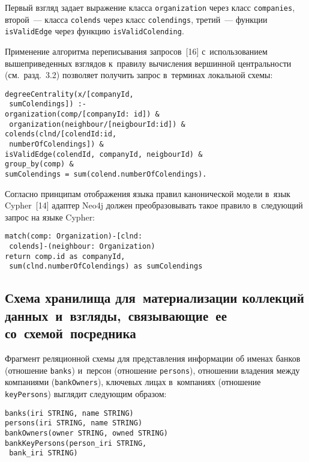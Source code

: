 \begin{multicols}{2}
      Первый взгляд задает выражение класса \verb"organization" через класс 
\verb"companies", второй~--- класса \verb"colends" через класс \verb"colendings", 
третий~--- функции \verb"isValidEdge" через функцию \verb"isValidColending".
      
      Применение алгоритма переписывания запросов~[16] с~использованием 
вышеприведенных взглядов к~правилу вычисления вершинной централь\-ности 
(см.\ разд.~3.2) позволяет получить запрос в~терминах локальной схемы:

\vspace*{-2pt}

      \noindent
      {\small\begin{verbatim}
degreeCentrality(x/[companyId, 
 sumColendings]) :-
organization(comp/[companyId: id]) & 
 organization(neighbour/[neigbourId:id]) &
colends(clnd/[colendId:id, 
 numberOfColendings]) &
isValidEdge(colendId, companyId, neigbourId) &
group_by(comp) &
sumColendings = sum(colend.numberOfColendings).
\end{verbatim}
}

\vspace*{-2pt}

      Согласно принципам отображения языка правил канонической модели 
в~язык Cypher~[14] адап\-тер Neo4j должен преобразовывать такое правило 
в~следующий запрос на языке Cypher:

\vspace*{-2pt}

  \noindent
     {\small \begin{verbatim}
match(comp: Organization)-[clnd:
 colends]-(neighbour: Organization)
return comp.id as companyId, 
 sum(clnd.numberOfColendings) as sumColendings
\end{verbatim}
}

\vspace*{-4pt}

\subsection{Схема хранилища для~материализации коллекций 
данных~и~взгляды,~связывающие~ее со~схемой~посредника}

\vspace*{-2pt}
      
      Фрагмент реляционной схемы для представления информации об 
именах банков (отношение \verb"banks") и~персон (отношение \verb"persons"), 
отношении владения между компаниями (\verb"bankOwners"), ключевых лицах 
в~компаниях (отношение \verb"keyPersons") выглядит следующим образом:
{\small      \begin{verbatim}
banks(iri STRING, name STRING)
persons(iri STRING, name STRING)
bankOwners(owner STRING, owned STRING)
bankKeyPersons(person_iri STRING,
 bank_iri STRING)
\end{verbatim}
}



\end{multicols}
